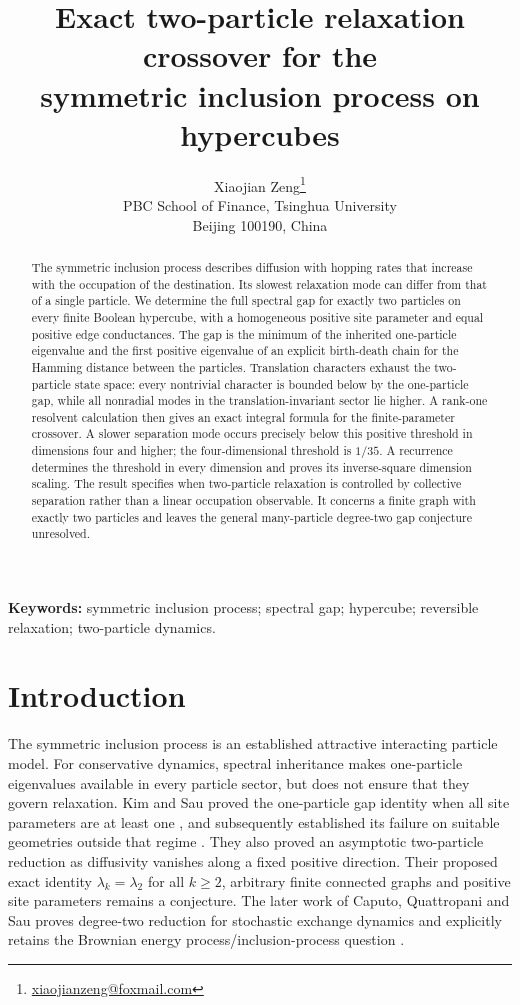 \documentclass[11pt,a4paper]{article}
\title{Exact two-particle relaxation crossover for the\protect\\
 symmetric inclusion process on hypercubes}
\author{Xiaojian Zeng\thanks{\href{mailto:xiaojianzeng@foxmail.com}{xiaojianzeng@foxmail.com}}\protect\\[2pt]
 \small PBC School of Finance, Tsinghua University\protect\\
 \small Beijing 100190, China}
\date{}
\begin{document}
\maketitle
\begin{abstract}
The symmetric inclusion process describes diffusion with hopping rates
that increase with the occupation of the destination. Its slowest relaxation mode
can differ from that of a single particle. We determine the full spectral
gap for exactly two particles on every finite Boolean hypercube, with a
homogeneous positive site parameter and equal positive edge conductances.
The gap is the minimum of the inherited one-particle eigenvalue and the
first positive eigenvalue of an explicit birth-death chain for the Hamming
distance between the particles. Translation characters exhaust the
two-particle state space: every nontrivial character is bounded below by
the one-particle gap, while all nonradial modes in the translation-invariant
sector lie higher. A rank-one resolvent calculation then gives an exact
integral formula for the finite-parameter crossover. A slower separation
mode occurs precisely below this positive threshold in dimensions four
and higher; the four-dimensional threshold is $1/35$. A recurrence determines
the threshold in every dimension and proves its inverse-square dimension
scaling. The result specifies when two-particle relaxation is controlled
by collective separation rather than a linear occupation observable.
It concerns a finite graph with exactly two particles and leaves the
general many-particle degree-two gap conjecture unresolved.
\end{abstract}
\noindent\textbf{Keywords:} symmetric inclusion process; spectral gap;
 hypercube; reversible relaxation; two-particle dynamics.

\section{Introduction}
The symmetric inclusion process is an established attractive interacting
particle model. For conservative dynamics, spectral inheritance makes
one-particle eigenvalues available in every particle sector, but does not
ensure that they govern relaxation. Kim and Sau proved the one-particle
gap identity when all site parameters are at least one
\cite{KimSau2024}, and subsequently established its failure on suitable
geometries outside that regime \cite{KimSau2026}. They also proved an
asymptotic two-particle reduction as diffusivity vanishes along a fixed
positive direction. Their proposed exact identity
$\lambda_k=\lambda_2$ for all $k\geq2$, arbitrary finite connected graphs
and positive site parameters remains a conjecture. The later work of
Caputo, Quattropani and Sau proves degree-two reduction for stochastic
exchange dynamics and explicitly retains the Brownian energy
process/inclusion-process question \cite[Sec.~1.4.6]{CaputoQuattropaniSau2026}.
\end{document}
